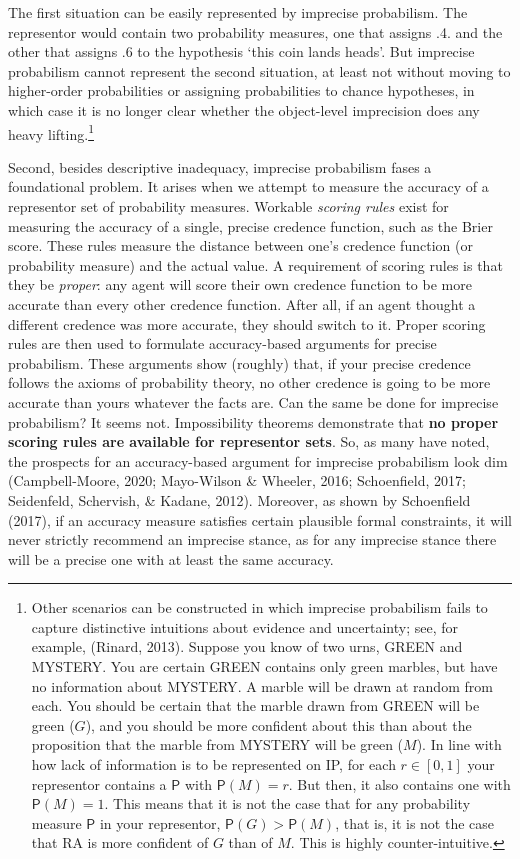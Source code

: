 \documentclass[
  10pt,
  dvipsnames,enabledeprecatedfontcommands]{scrartcl}
\newcommand{\pr}[1]{\mathsf{P}(#1)}
\begin{document}
\noindent The first situation can be easily represented by imprecise
probabilism. The representor would contain two probability measures, one
that assigns .4. and the other that assigns .6 to the hypothesis `this
coin lands heads'. But imprecise probabilism cannot represent the second
situation, at least not without moving to higher-order probabilities or
assigning probabilities to chance hypotheses, in which case it is no
longer clear whether the object-level imprecision does any heavy
lifting.\footnote{Other scenarios can be constructed in which imprecise
  probabilism fails to capture distinctive intuitions about evidence and
  uncertainty; see, for example, (Rinard, 2013). Suppose you know of two
  urns, \textsf{GREEN} and \textsf{MYSTERY}. You are certain
  \textsf{GREEN} contains only green marbles, but have no information
  about \textsf{MYSTERY}. A marble will be drawn at random from each.
  You should be certain that the marble drawn from \textsf{GREEN} will
  be green (\(G\)), and you should be more confident about this than
  about the proposition that the marble from \textsf{MYSTERY} will be
  green (\(M\)). In line with how lack of information is to be
  represented on \textsf{IP}, for each \(r\in [0,1]\) your representor
  contains a \(\mathsf{P}\) with \(\pr{M}=r\). But then, it also
  contains one with \(\pr{M}=1\). This means that it is not the case
  that for any probability measure \(\mathsf{P}\) in your representor,
  \(\mathsf{P}(G) > \mathsf{P}(M)\), that is, it is not the case that RA
  is more confident of \(G\) than of \(M\). This is highly
  counter-intuitive.}

Second, besides descriptive inadequacy, imprecise probabilism fases a
foundational problem. It arises when we attempt to measure the accuracy
of a representor set of probability measures. Workable \emph{scoring
rules} exist for measuring the accuracy of a single, precise credence
function, such as the Brier score. These rules measure the distance
between one's credence function (or probability measure) and the actual
value. A requirement of scoring rules is that they be \emph{proper}: any
agent will score their own credence function to be more accurate than
every other credence function. After all, if an agent thought a
different credence was more accurate, they should switch to it. Proper
scoring rules are then used to formulate accuracy-based arguments for
precise probabilism. These arguments show (roughly) that, if your
precise credence follows the axioms of probability theory, no other
credence is going to be more accurate than yours whatever the facts are.
Can the same be done for imprecise probabilism? It seems not.
Impossibility theorems demonstrate that \textbf{no proper scoring rules
are available for representor sets}. So, as many have noted, the
prospects for an accuracy-based argument for imprecise probabilism look
dim (Campbell-Moore, 2020; Mayo-Wilson \& Wheeler, 2016; Schoenfield,
2017; Seidenfeld, Schervish, \& Kadane, 2012). Moreover, as shown by
Schoenfield (2017), if an accuracy measure satisfies certain plausible
formal constraints, it will never strictly recommend an imprecise
stance, as for any imprecise stance there will be a precise one with at
least the same accuracy.
\end{document}
